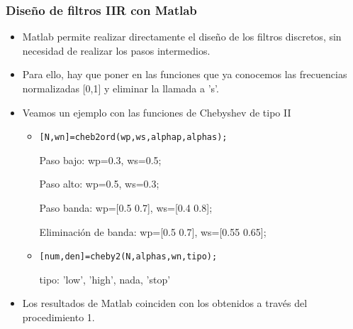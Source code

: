 \begin{frame}
\frametitle{Diseño de filtros  IIR con Matlab}
\footnotesize
\begin{itemize}
\item Matlab permite realizar directamente el diseño de los filtros discretos, sin necesidad de realizar los pasos intermedios.
\item Para ello, hay que poner en las funciones que ya conocemos las frecuencias normalizadas [0,1] y eliminar la llamada a 's'.

\item Veamos un ejemplo con las funciones de Chebyshev de tipo II
\begin{itemize}
\item \alert{\texttt{[N,wn]=cheb2ord(wp,ws,alphap,alphas);}}

\vspace{0.1cm}

{\footnotesize
\hspace{0.5cm}Paso bajo: wp=0.3, ws=0.5;

\vspace{0.1cm}

\hspace{0.5cm}Paso alto: wp=0.5, ws=0.3;

\vspace{0.1cm}

\hspace{0.5cm}Paso banda: wp=[0.5 0.7], ws=[0.4 0.8];

\vspace{0.1cm}

\hspace{0.5cm}Eliminación de banda: wp=[0.5 0.7], ws=[0.55 0.65];}

\vspace{0.1cm}

\item\alert{\texttt{[num,den]=cheby2(N,alphas,wn,tipo);}}

\vspace{0.1cm}

\hspace{0.5cm}tipo: 'low', 'high', nada, 'stop'

\end{itemize}


\item Los resultados de Matlab coinciden con los obtenidos a través del procedimiento 1.

\end{itemize}

\end{frame}





